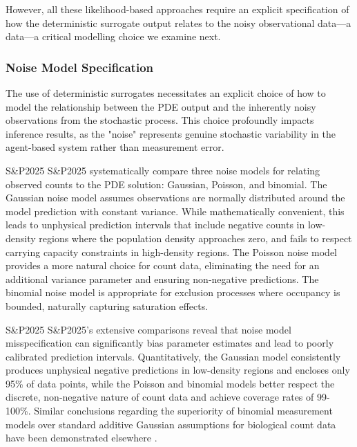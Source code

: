 \documentclass{article}
\newcommand{\SP}{S\&P2025}
\providecommand{\DIFaddtex}[1]{{\protect\color{blue} \sf #1}} %
\providecommand{\DIFdeltex}[1]{{\protect\color{red} \scriptsize #1}} %
\providecommand{\DIFaddbegin}{} %
\providecommand{\DIFaddend}{} %
\providecommand{\DIFdelbegin}{} %
\providecommand{\DIFdelend}{} %
\providecommand{\DIFadd}[1]{\texorpdfstring{\DIFaddtex{#1}}{#1}} %
\providecommand{\DIFdel}[1]{\texorpdfstring{\DIFdeltex{#1}}{}} %
\newcommand{\DIFscaledelfig}{0.5}
\newlength{\DIFdelgraphicswidth} %
\newlength{\DIFdelgraphicsheight} %
\newcommand{\DIFaddincludegraphics}[2][]{{\color{blue}\fbox{\DIFOincludegraphics[#1]{#2}}}} %
\newcommand{\DIFdelincludegraphics}[2][]{%
\sbox{\DIFdelgraphicsbox}{\DIFOincludegraphics[#1]{#2}}%
\settoboxwidth{\DIFdelgraphicswidth}{\DIFdelgraphicsbox} %
\settoboxtotalheight{\DIFdelgraphicsheight}{\DIFdelgraphicsbox} %
\scalebox{\DIFscaledelfig}{%
\parbox[b]{\DIFdelgraphicswidth}{\usebox{\DIFdelgraphicsbox}\\[-\baselineskip] \rule{\DIFdelgraphicswidth}{0em}}\llap{\resizebox{\DIFdelgraphicswidth}{\DIFdelgraphicsheight}{%
\setlength{\unitlength}{\DIFdelgraphicswidth}%
\begin{picture}(1,1)%
\thicklines\linethickness{2pt} %
{\color[rgb]{1,0,0}\put(0,0){\framebox(1,1){}}}%
{\color[rgb]{1,0,0}\put(0,0){\line( 1,1){1}}}%
{\color[rgb]{1,0,0}\put(0,1){\line(1,-1){1}}}%
\end{picture}%
}\hspace*{3pt}}} %
} %
\DeclareRobustCommand{\DIFaddbegin}{\DIFOaddbegin \let\includegraphics\DIFaddincludegraphics} %
\DeclareRobustCommand{\DIFaddend}{\DIFOaddend \let\includegraphics\DIFOincludegraphics} %
\DeclareRobustCommand{\DIFdelbegin}{\DIFOdelbegin \let\includegraphics\DIFdelincludegraphics} %
\DeclareRobustCommand{\DIFdelend}{\DIFOaddend \let\includegraphics\DIFOincludegraphics} %
\begin{document}
However, all these likelihood-based approaches require an explicit specification of how the deterministic surrogate output relates to the noisy observational \DIFdelbegin \DIFdel{data—a }\DIFdelend \DIFaddbegin \DIFadd{data---a }\DIFaddend critical modelling choice we examine next.


\subsubsection{Noise Model Specification}\label{sec:noise_model}

The use of deterministic surrogates necessitates an explicit choice of how to model the relationship between the PDE output and the inherently noisy observations from the stochastic process. This choice profoundly impacts inference results, as the "noise" represents genuine stochastic variability in the agent-based system rather than measurement error.

\DIFdelbegin \DIFdel{S\&P2025 }\DIFdelend \DIFaddbegin \DIFadd{\SP{} }\DIFaddend systematically compare three noise models for relating observed counts to the PDE solution: Gaussian, Poisson, and binomial. The Gaussian noise model assumes observations are normally distributed around the model prediction with constant variance. While mathematically convenient, this leads to unphysical prediction intervals that include negative counts in low-density regions where the population density approaches zero, and fails to respect carrying capacity constraints in high-density regions. The
Poisson noise model provides a more natural choice for count data, eliminating the need for an additional variance parameter and ensuring non-negative predictions. The binomial noise model is appropriate for exclusion processes where occupancy is bounded, naturally capturing saturation effects.

\DIFdelbegin \DIFdel{S\&P2025}\DIFdelend \DIFaddbegin \DIFadd{\SP}\DIFaddend 's extensive comparisons reveal that noise model misspecification can significantly bias parameter estimates and lead to poorly calibrated prediction intervals. Quantitatively, the Gaussian model consistently produces unphysical negative predictions in low-density regions and encloses only 95\% of data points, while the Poisson and binomial models better respect the discrete, non-negative nature of count data and achieve coverage rates of 99-100\%. Similar conclusions regarding the superiority of binomial measurement models over standard additive Gaussian assumptions for biological count data have been demonstrated elsewhere \citep{SIMPSON2024111732}.
\end{document}
